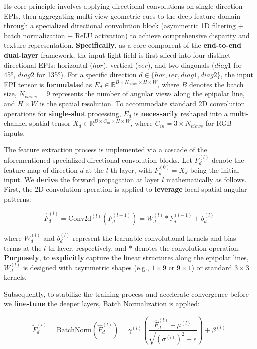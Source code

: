 \documentclass[journal]{IEEEtran}
\begin{document}
Its core principle involves applying directional convolutions on single-direction EPIs, then aggregating multi-view geometric cues to the deep feature domain through a specialized directional convolution block (asymmetric 1D filtering + batch normalization + ReLU activation) to achieve comprehensive disparity and texture representation. \textbf{Specifically}, as a core component of the \textbf{end-to-end} \textbf{dual-layer} framework, the input light field is first sliced into four distinct directional EPIs: horizontal ($hor$), vertical ($ver$), and two diagonals ($diag1$ for 45°, $diag2$ for 135°). For a specific direction $d \in \{hor, ver, diag1, diag2\}$, the input EPI tensor is \textbf{formulate}d as $E_d \in \mathbb{R}^{B \times N_{views} \times H \times W}$, where $B$ denotes the batch size, $N_{views}=9$ represents the number of angular views along the epipolar line, and $H \times W$ is the spatial resolution. To accommodate standard 2D convolution operations for \textbf{single-shot} processing, $E_d$ is \textbf{necessarily} reshaped into a multi-channel spatial tensor $X_d \in \mathbb{R}^{B \times C_{in} \times H \times W}$, where $C_{in} = 3 \times N_{views}$ for RGB inputs.

The feature extraction process is implemented via a cascade of the aforementioned specialized directional convolution blocks. Let $F_d^{(l)}$ denote the feature map of direction $d$ at the $l$-th layer, with $F_d^{(0)} = X_d$ being the initial input. We \textbf{derive} the forward propagation at layer $l$ mathematically as follows. First, the 2D convolution operation is applied to \textbf{leverage} local spatial-angular patterns:

\[
\hat{F}_d^{(l)} = \text{Conv2d}^{(l)}(F_d^{(l-1)}) = W_d^{(l)} * F_d^{(l-1)} + b_d^{(l)} \label{eq:conv}
\]

where $W_d^{(l)}$ and $b_d^{(l)}$ represent the learnable convolutional kernels and bias terms at the $l$-th layer, respectively, and $*$ denotes the convolution operation. \textbf{Purposely}, to \textbf{explicitly} capture the linear structures along the epipolar lines, $W_d^{(l)}$ is designed with asymmetric shapes (e.g., $1 \times 9$ or $9 \times 1$) or standard $3 \times 3$ kernels. 

Subsequently, to stabilize the training process and accelerate convergence before we \textbf{fine-tune} the deeper layers, Batch Normalization is applied:

\[
\tilde{F}_d^{(l)} = \text{BatchNorm}(\hat{F}_d^{(l)}) = \gamma^{(l)} \left( \frac{\hat{F}_d^{(l)} - \mu^{(l)}}{\sqrt{(\sigma^{(l)})^2 + \epsilon}} \right) + \beta^{(l)} \label{eq:bn}
\]
\end{document}
